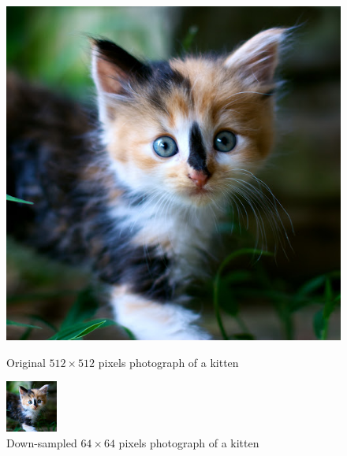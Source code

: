 \begin{figure}[!htbp]
	\centering
	\begin{minipage}[b]{0.45\textwidth}
		\includegraphics[width=\textwidth]{pictures/kitten.jpg}
		\caption[Original resolution photograph of a kitten]{Original $512\times512$ pixels photograph of a kitten \cite{travers_2009}}\label{fig:lennaoriginal}
	\end{minipage}
	\hfill
	\begin{minipage}[b]{0.45\textwidth}
		\includegraphics[width=\textwidth]{pictures/KittenDown.jpg}
		\caption[Reduced resolution photograph of a kitten]{Down-sampled $64\times64$ pixels photograph of a kitten}\label{fig:lennareduced}
	\end{minipage}
\end{figure}

